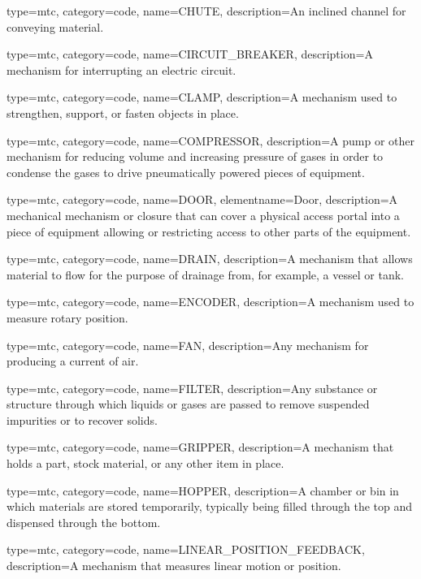 {
  type=mtc,
  category=code,
  name={CHUTE},
  description={An inclined channel for conveying material.}
}

{
  type=mtc,
  category=code,
  name={CIRCUIT\_BREAKER},
  description={A mechanism for interrupting an electric circuit.}
}

{
  type=mtc,
  category=code,
  name={CLAMP},
  description={A mechanism used to strengthen, support, or fasten objects in place.}
}

{
  type=mtc,
  category=code,
  name={COMPRESSOR},
  description={A pump or other mechanism for reducing volume and increasing pressure of gases in order to condense the gases to drive pneumatically powered pieces of equipment.}
}

{
  type=mtc,
  category=code,
  name={DOOR},
  elementname={Door},
  description={A mechanical mechanism or closure that can cover a physical access portal into a piece of equipment allowing or restricting access to other parts of the equipment.}
}

{
  type=mtc,
  category=code,
  name={DRAIN},
  description={A mechanism that allows material to flow for the purpose of drainage from, for example, a vessel or tank.}
}

{
  type=mtc,
  category=code,
  name={ENCODER},
  description={A mechanism used to measure rotary position.}
}

{
  type=mtc,
  category=code,
  name={FAN},
  description={Any mechanism for producing a current of air.}
}

{
  type=mtc,
  category=code,
  name={FILTER},
  description={Any substance or structure through which liquids or gases are passed to remove suspended impurities or to recover solids.}
}

{
  type=mtc,
  category=code,
  name={GRIPPER},
  description={A mechanism that holds a part, stock material, or any other item in place.}
}

{
  type=mtc,
  category=code,
  name={HOPPER},
  description={A chamber or bin in which materials are stored temporarily, typically being filled through the top and dispensed through the bottom.}
}

{
  type=mtc,
  category=code,
  name={LINEAR\_POSITION\_FEEDBACK},
  description={A mechanism that measures linear motion or position.}
}

